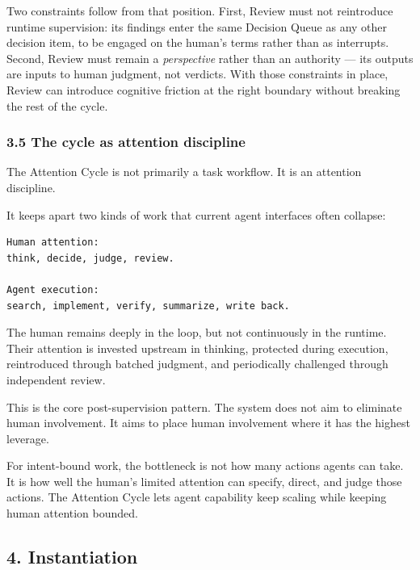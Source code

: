 \documentclass[
  nonatbib,
  preprint]{article}
\begin{document}
Two constraints follow from that position. First, Review must not
reintroduce runtime supervision: its findings enter the same Decision
Queue as any other decision item, to be engaged on the human's terms
rather than as interrupts. Second, Review must remain a
\emph{perspective} rather than an authority --- its outputs are inputs
to human judgment, not verdicts. With those constraints in place, Review
can introduce cognitive friction at the right boundary without breaking
the rest of the cycle.

\subsubsection{\texorpdfstring{\textbf{3.5 The cycle as attention
discipline}}{3.5 The cycle as attention discipline}}\label{the-cycle-as-attention-discipline}

The Attention Cycle is not primarily a task workflow. It is an attention
discipline.

It keeps apart two kinds of work that current agent interfaces often
collapse:

\begin{verbatim}
Human attention:
think, decide, judge, review.

Agent execution:
search, implement, verify, summarize, write back.
\end{verbatim}

The human remains deeply in the loop, but not continuously in the
runtime. Their attention is invested upstream in thinking, protected
during execution, reintroduced through batched judgment, and
periodically challenged through independent review.

This is the core post-supervision pattern. The system does not aim to
eliminate human involvement. It aims to place human involvement where it
has the highest leverage.

For intent-bound work, the bottleneck is not how many actions agents can
take. It is how well the human's limited attention can specify, direct,
and judge those actions. The Attention Cycle lets agent capability keep
scaling while keeping human attention bounded.

\subsection{\texorpdfstring{\textbf{4.
Instantiation}}{4. Instantiation}}\label{instantiation}
\end{document}
